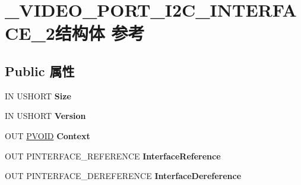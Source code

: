 \hypertarget{struct___v_i_d_e_o___p_o_r_t___i2_c___i_n_t_e_r_f_a_c_e__2}{}\section{\+\_\+\+V\+I\+D\+E\+O\+\_\+\+P\+O\+R\+T\+\_\+\+I2\+C\+\_\+\+I\+N\+T\+E\+R\+F\+A\+C\+E\+\_\+2结构体 参考}
\label{struct___v_i_d_e_o___p_o_r_t___i2_c___i_n_t_e_r_f_a_c_e__2}
\subsection*{Public 属性}
\begin{DoxyCompactItemize}
\item 
\mbox{\label{struct___v_i_d_e_o___p_o_r_t___i2_c___i_n_t_e_r_f_a_c_e__2_aca106bdad9afc003acca916c99386405}} 
IN U\+S\+H\+O\+RT {\bfseries Size}
\item 
\mbox{\label{struct___v_i_d_e_o___p_o_r_t___i2_c___i_n_t_e_r_f_a_c_e__2_aa480cecc0cc820bdb1d1cf0443e051a6}} 
IN U\+S\+H\+O\+RT {\bfseries Version}
\item 
\mbox{\label{struct___v_i_d_e_o___p_o_r_t___i2_c___i_n_t_e_r_f_a_c_e__2_a2d2c2570d35feaf4411881c867be63f8}} 
O\+UT \hyperlink{interfacevoid}{P\+V\+O\+ID} {\bfseries Context}
\item 
\mbox{\label{struct___v_i_d_e_o___p_o_r_t___i2_c___i_n_t_e_r_f_a_c_e__2_a0c5b8df0854af7b53735c9b482d00779}} 
O\+UT P\+I\+N\+T\+E\+R\+F\+A\+C\+E\+\_\+\+R\+E\+F\+E\+R\+E\+N\+CE {\bfseries Interface\+Reference}
\item 
\mbox{\label{struct___v_i_d_e_o___p_o_r_t___i2_c___i_n_t_e_r_f_a_c_e__2_a1cb804cf85e1828995f78ab806f6b997}} 
O\+UT P\+I\+N\+T\+E\+R\+F\+A\+C\+E\+\_\+\+D\+E\+R\+E\+F\+E\+R\+E\+N\+CE {\bfseries Interface\+Dereference}
\item 
\mbox{\label{struct___v_i_d_e_o___p_o_r_t___i2_c___i_n_t_e_r_f_a_c_e__2_a7f0d0456b70b7e7aed40ac10a5350b2d}} 

\end{DoxyCompactItemize}
